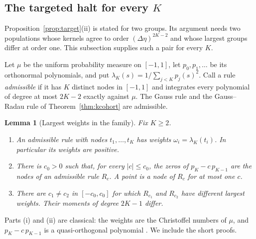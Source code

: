 \documentclass[12pt]{article}
\newtheorem{lemma}[theorem]{Lemma}
\theoremstyle{definition}
\theoremstyle{remark}
\begin{document}
\subsection{The targeted halt for every $K$}\label{app:everyK}

Proposition~\ref{prop:target}(ii) is stated for two groups. Its argument needs two populations whose kernels agree to order $(\Delta\eta)^{2K-2}$ and whose largest groups differ at order one. This subsection supplies such a pair for every $K$.

Let $\mu$ be the uniform probability measure on $[-1,1]$, let $p_0,p_1,\ldots$ be its orthonormal polynomials, and put $\lambda_K(s)=1/\sum_{j<K}p_j(s)^2$. Call a rule \emph{admissible} if it has $K$ distinct nodes in $[-1,1]$ and integrates every polynomial of degree at most $2K-2$ exactly against $\mu$. The Gauss rule and the Gauss--Radau rule of Theorem~\ref{thm:kcohort} are admissible.

\begin{lemma}[Largest weights in the family]\label{lem:everyK}
Fix $K\ge2$.
\begin{enumerate}[label=(\roman*),itemsep=1pt]
\item An admissible rule with nodes $t_1,\ldots,t_K$ has weights $\omega_i=\lambda_K(t_i)$. In particular its weights are positive.
\item There is $c_0>0$ such that, for every $|c|\le c_0$, the zeros of $p_K-c\,p_{K-1}$ are the nodes of an admissible rule $R_c$. A point is a node of $R_c$ for at most one $c$.
\item There are $c_1\ne c_2$ in $[-c_0,c_0]$ for which $R_{c_1}$ and $R_{c_2}$ have different largest weights. Their moments of degree $2K-1$ differ.
\end{enumerate}
\end{lemma}

Parts (i) and (ii) are classical: the weights are the Christoffel numbers of $\mu$, and $p_K-c\,p_{K-1}$ is a quasi-orthogonal polynomial \citep{szego1975,gautschi2004}. We include the short proofs.
\end{document}

